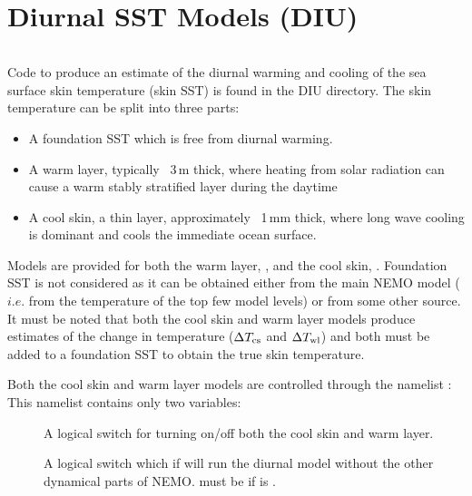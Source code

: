 \documentclass[../tex_main/NEMO_manual]{subfiles}
\begin{document}
\chapter{Diurnal SST Models (DIU)}
\label{chap:DIU}

\minitoc


\newpage
$\ $\newline %

Code to produce an estimate of the diurnal warming and cooling of the sea surface skin
temperature (skin SST) is found in the DIU directory.  
The skin temperature can be split into three parts:
\begin{itemize}
\item A foundation SST which is free from diurnal warming.
\item A warm layer, typically ~3\,m thick, where heating from solar radiation can
cause a warm stably stratified layer during the daytime
\item A cool skin, a thin layer, approximately ~1\,mm thick, where long wave cooling
is dominant and cools the immediate ocean surface.
\end{itemize}

Models are provided for both the warm layer, , and the cool skin,
.  Foundation SST is not considered as it can be obtained
either from the main NEMO model ($i.e.$ from the temperature of the top few model levels)
or from some other source.  
It must be noted that both the cool skin and warm layer models produce estimates of 
the change in temperature ($\Delta T_{\rm{cs}}$ and $\Delta T_{\rm{wl}}$) 
and both must be added to a foundation SST to obtain the true skin temperature.

Both the cool skin and warm layer models are controlled through the namelist :
This namelist contains only two variables:
\begin{description}
\item[] A logical switch for turning on/off both the cool skin and warm layer.
\item[] A logical switch which if  will run the diurnal model
without the other dynamical parts of NEMO.  
 must be  if  is .
\end{description}
\end{document}
